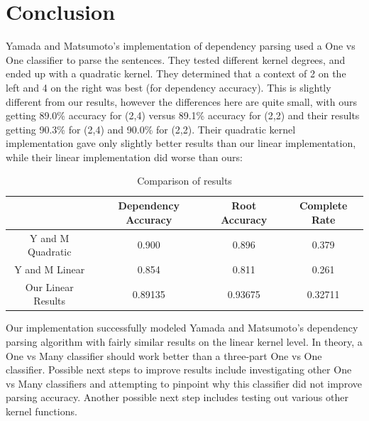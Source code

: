 \documentclass[12pt]{amsart}
\begin{document}
\section{Conclusion}
Yamada and Matsumoto's implementation of dependency parsing used a One vs One classifier to parse the sentences. They tested different kernel degrees, and ended up with a quadratic kernel. They determined that a context of 2 on the left and 4 on the right was best (for dependency accuracy). This is slightly different from our results, however the differences here are quite small, with ours getting 89.0\% accuracy for (2,4) versus 89.1\% accuracy for (2,2) and their results getting 90.3\% for (2,4) and 90.0\% for (2,2). Their quadratic kernel implementation gave only slightly better results than our linear implementation, while their linear implementation did worse than ours:       \\
\begin{table}
\caption{Comparison of results}
 \begin{tabular}{cccc}
            \hline \hline & Dependency Accuracy & Root Accuracy & Complete Rate \\ \hline
            Y and M Quadratic & 0.900 & 0.896 & 0.379 \\ 
            Y and M Linear & 0.854 & 0.811 & 0.261 \\ 
            Our Linear Results & 0.89135 & 0.93675 & 0.32711 \\
            \hline

        \end{tabular}
\end{table}
Our implementation successfully modeled Yamada and Matsumoto's dependency parsing algorithm with fairly similar results on the linear kernel level. In theory, a One vs Many classifier should work better than a three-part One vs One classifier. Possible next steps to improve results include investigating other One vs Many classifiers and attempting to pinpoint why this classifier did not improve parsing accuracy. Another possible next step includes testing out various other kernel functions.
        


        

\end{document}
